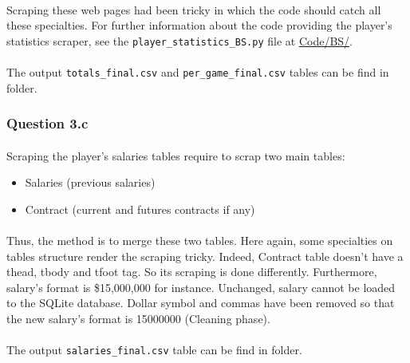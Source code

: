 \paragraph{}Scraping these web pages had been tricky in which the code should catch all these specialties. For further information about the code providing the player's statistics scraper, see the \verb|player_statistics_BS.py| file at \url{Code/BS/}.

\paragraph{}The output \verb|totals_final.csv| and \verb|per_game_final.csv| tables can be find in  folder.

\subsubsection{Question 3.c}
\label{subsubsec:313c}

\paragraph{}Scraping the player's salaries tables require to scrap two main tables:

\begin{itemize}
	\item Salaries (previous salaries)
	\item Contract (current and futures contracts if any)
\end{itemize}

\paragraph{}Thus, the method is to merge these two tables. Here again, some specialties on tables structure render the scraping tricky. Indeed, Contract table doesn't have a thead, tbody and tfoot tag. So its scraping is done differently. Furthermore, salary's format is \$15,000,000 for instance. Unchanged, salary cannot be loaded to the SQLite database. Dollar symbol and commas have been removed so that the new salary's format is 15000000 (Cleaning phase).

\paragraph{}The output \verb|salaries_final.csv| table can be find in  folder.

